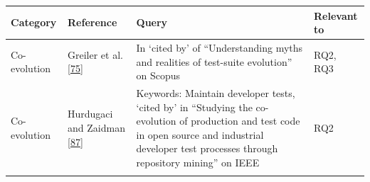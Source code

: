 \documentclass[]{book}
\begin{document}
\begin{longtable}[]{@{}llll@{}}
\toprule
\begin{minipage}[b]{0.18\columnwidth}\raggedright\strut
Category\strut
\end{minipage} & \begin{minipage}[b]{0.16\columnwidth}\raggedright\strut
Reference\strut
\end{minipage} & \begin{minipage}[b]{0.50\columnwidth}\raggedright\strut
Query\strut
\end{minipage} & \begin{minipage}[b]{0.04\columnwidth}\raggedright\strut
Relevant to\strut
\end{minipage}\tabularnewline
\midrule
\endhead
\begin{minipage}[t]{0.18\columnwidth}\raggedright\strut
Co-evolution\strut
\end{minipage} & \begin{minipage}[t]{0.16\columnwidth}\raggedright\strut
Greiler et al. {[}\protect\hyperlink{ref-greiler2013}{75}{]}\strut
\end{minipage} & \begin{minipage}[t]{0.50\columnwidth}\raggedright\strut
In `cited by' of ``Understanding myths and realities of test-suite
evolution'' on Scopus\strut
\end{minipage} & \begin{minipage}[t]{0.04\columnwidth}\raggedright\strut
RQ2, RQ3\strut
\end{minipage}\tabularnewline
\begin{minipage}[t]{0.18\columnwidth}\raggedright\strut
Co-evolution\strut
\end{minipage} & \begin{minipage}[t]{0.16\columnwidth}\raggedright\strut
Hurdugaci and Zaidman
{[}\protect\hyperlink{ref-hurdugaci2012}{87}{]}\strut
\end{minipage} & \begin{minipage}[t]{0.50\columnwidth}\raggedright\strut
Keywords: Maintain developer tests, `cited by' in ``Studying the
co-evolution of production and test code in open source and industrial
developer test processes through repository mining'' on IEEE\strut
\end{minipage} & \begin{minipage}[t]{0.04\columnwidth}\raggedright\strut
RQ2\strut
\end{minipage}\tabularnewline
\begin{minipage}[t]{0.18\columnwidth}\raggedright\strut

\end{minipage}
\end{longtable}
\end{document}
